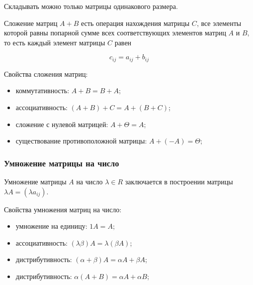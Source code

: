 \documentclass{article}
\begin{document}
Складывать можно только матрицы одинакового размера.

Сложение матриц  $A+B$ есть операция нахождения матрицы $C$, все элементы которой равны попарной сумме всех соответствующих элементов матриц $A$ и $B$, то есть каждый элемент матрицы $C$ равен

      $$ c_{ij} = a_{ij} + b_{ij}$$

Свойства сложения матриц:
\begin{itemize}
    \item коммутативность: $A+B = B+A$;
    \item ассоциативность: $(A+B)+C =A+(B+C)$;
    \item сложение с нулевой матрицей: $A + \Theta = A$;
    \item существование противоположной матрицы: $A + (-A) = \Theta$;
\end{itemize}

\subsubsection*{Умножение матрицы на число}

Умножение матрицы $A$ на число $\lambda \in R$ заключается в построении матрицы $\lambda A = ( \lambda a_{ij} )$.



Свойства умножения матриц на число:
\begin{itemize}
    \item умножение на единицу: $1A = A$;
    \item ассоциативность: $(\lambda\beta)A = \lambda(\beta A)$;
    \item дистрибутивность: $(\alpha+\beta)A = \alpha A + \beta A$;
    \item дистрибутивность: $\alpha(A+B) = \alpha A + \alpha B$;
\end{itemize}
\end{document}
